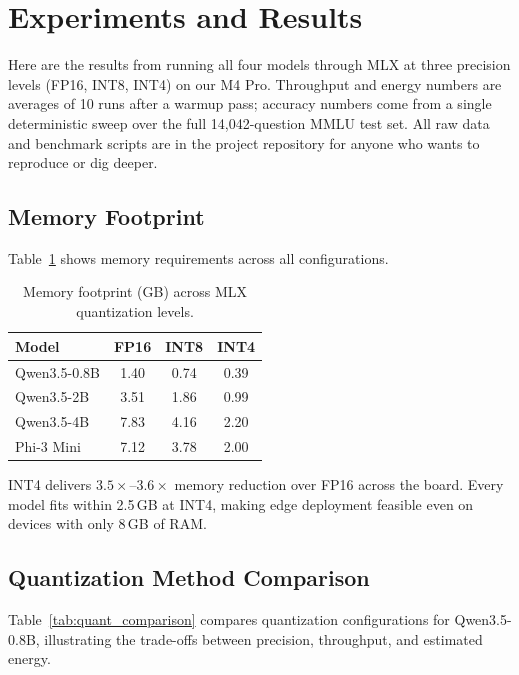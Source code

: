 \documentclass[11pt,a4paper]{article}
\begin{document}
\section{Experiments and Results}

Here are the results from running all four models through MLX at three precision levels (FP16, INT8, INT4) on our M4 Pro. Throughput and energy numbers are averages of 10 runs after a warmup pass; accuracy numbers come from a single deterministic sweep over the full 14,042-question MMLU test set. All raw data and benchmark scripts are in the project repository for anyone who wants to reproduce or dig deeper.

\subsection{Memory Footprint}

Table~\ref{tab:memory} shows memory requirements across all configurations.

\begin{table}[htbp]
\centering
\caption{Memory footprint (GB) across MLX quantization levels.}
\label{tab:memory}
\begin{tabular}{l|ccc}
\toprule
\textbf{Model} & \textbf{FP16} & \textbf{INT8} & \textbf{INT4} \\
\midrule
Qwen3.5-0.8B & 1.40 & 0.74 & 0.39 \\
Qwen3.5-2B & 3.51 & 1.86 & 0.99 \\
Qwen3.5-4B & 7.83 & 4.16 & 2.20 \\
Phi-3 Mini & 7.12 & 3.78 & 2.00 \\
\bottomrule
\end{tabular}
\end{table}

INT4 delivers $3.5\times$--$3.6\times$ memory reduction over FP16 across the board. Every model fits within 2.5\,GB at INT4, making edge deployment feasible even on devices with only 8\,GB of RAM.

\subsection{Quantization Method Comparison}

Table~\ref{tab:quant_comparison} compares quantization configurations for Qwen3.5-0.8B, illustrating the trade-offs between precision, throughput, and estimated energy.
\end{document}
